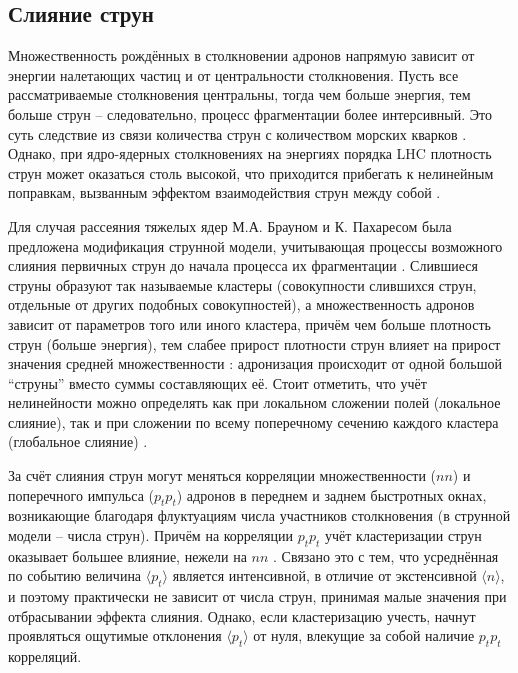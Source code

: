 \subsection{Слияние струн}
Множественность рождённых в столкновении адронов напрямую зависит от энергии налетающих частиц и от центральности столкновения. 
Пусть все рассматриваемые столкновения центральны, тогда чем больше энергия, тем больше струн -- следовательно, процесс фрагментации более интерсивный. Это суть следствие из связи количества струн с количеством морских кварков \cite{SeaQarkStrings}. 
Однако, при ядро-ядерных столкновениях на энергиях порядка LHC плотность струн может оказаться столь высокой, что приходится прибегать к нелинейным поправкам, вызванным эффектом взаимодействия струн между собой \cite{StringFusion}.

Для случая рассеяния тяжелых ядер М.А. Брауном и К. Пахаресом была предложена модификация струнной модели, учитывающая процессы возможного слияния первичных струн до начала процесса их фрагментации \cite{PreFusion1, PreFusion2, PreFusion3, PreFusion4}. 
Слившиеся струны образуют так называемые кластеры (совокупности слившихся струн, отдельные от других подобных совокупностей), а множественность адронов зависит от параметров того или иного кластера, причём чем больше плотность струн (больше энергия), тем слабее прирост плотности струн влияет на прирост значения средней множественности \cite{MulReduction}: адронизация происходит от одной большой ``струны'' вместо суммы составляющих её. 
Стоит отметить, что учёт нелинейности можно определять как при локальном сложении полей (локальное слияние), так и при сложении по всему поперечному сечению каждого кластера (глобальное слияние) \cite{MulReduction}.

За счёт слияния струн могут меняться корреляции множественности ($nn$) и поперечного импульса ($p_t p_t$) адронов в переднем и заднем быстротных окнах, возникающие благодаря флуктуациям числа участников столкновения (в струнной модели -- числа струн). 
Причём на корреляции $p_t p_t$ учёт кластеризации струн оказывает большее влияние, нежели на $nn$ \cite{MulReduction, PtPtCorr}. 
Связано это с тем, что усреднённая по событию величина $\langle p_t \rangle$ является интенсивной, в отличие от экстенсивной $\langle n \rangle$, и поэтому практически не зависит от числа струн, принимая малые значения при отбрасывании эффекта слияния. 
Однако, если кластеризацию учесть, начнут проявляться ощутимые отклонения $\langle p_t \rangle$ от нуля, влекущие за собой наличие $p_t p_t$ корреляций.

